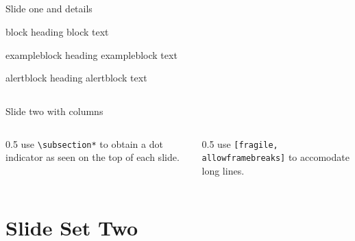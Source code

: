 \documentclass{tomibeamer}
\begin{document}
\subsection*{}
\begin{frame}[fragile]{\vspace{-20pt}Slide one and details}\vspace{-20pt}


  \begin{block}{block heading}
    block text
  \end{block}
  \begin{exampleblock}{exampleblock heading}
    exampleblock text
  \end{exampleblock}
  \begin{alertblock}{alertblock heading}
    alertblock text
  \end{alertblock}
\end{frame}

\subsection*{}
\begin{frame}{\vspace{-15pt}Slide two with columns}\vspace{-20pt}\parskip=8pt
  \begin{columns}
    \begin{column}{0.5\textwidth}
      use \texttt{\textbackslash subsection*{}} to obtain a dot indicator as seen on the top of each slide.
    \end{column}
    \begin{column}{0.5\textwidth}
      use \texttt{[fragile, allowframebreaks]} to accomodate long lines.
   \end{column}
  \end{columns}
\end{frame}

\section{Slide Set Two}
\begin{frame}{\vspace{-10pt}\insertsectionhead}
  \begin{center}
    \Huge \insertsectionhead
  \end{center}
\end{frame}
\end{document}
